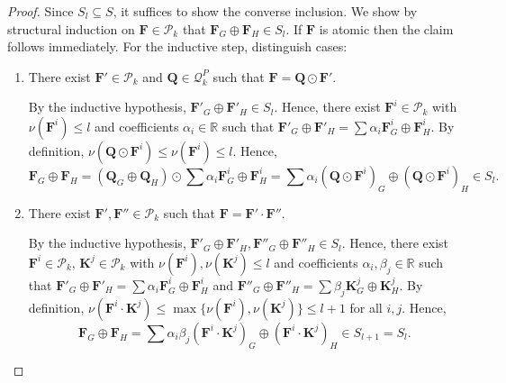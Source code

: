 \documentclass[10pt,a4paper]{amsart}
\begin{document}
\begin{proof}
	Since $S_l \subseteq S$, it suffices to show the converse inclusion.
	We show by structural induction on $\boldsymbol{F} \in \mathcal{P}_k$ that $\boldsymbol{F}_G \oplus \boldsymbol{F}_H \in S_l$.
	If $\boldsymbol{F}$ is atomic then the claim follows immediately.
	For the inductive step, distinguish cases:
	\begin{enumerate}
		\item There exist $\boldsymbol{F}' \in \mathcal{P}_k$ and $\boldsymbol{Q} \in \mathcal{Q}_k^P$ such that $\boldsymbol{F} = \boldsymbol{Q} \odot \boldsymbol{F}'$.
		
		By the inductive hypothesis, $\boldsymbol{F}'_G \oplus \boldsymbol{F}'_H \in S_l$.
		Hence, there exist $\boldsymbol{F}^i \in \mathcal{P}_k$ with $\nu(\boldsymbol{F}^i) \leq l$ and coefficients $\alpha_i \in \mathbb{R}$ such that $\boldsymbol{F}'_G \oplus \boldsymbol{F}'_H  = \sum \alpha_i \boldsymbol{F}^i_G \oplus \boldsymbol{F}^i_H$.
		By definition, $\nu(\boldsymbol{Q} \odot \boldsymbol{F}^i) \leq \nu(\boldsymbol{F}^i) \leq l$.
		Hence,
		\[
			\boldsymbol{F}_G \oplus \boldsymbol{F}_H = (\boldsymbol{Q}_G \oplus \boldsymbol{Q}_H) \odot \sum \alpha_i \boldsymbol{F}^i_G \oplus \boldsymbol{F}^i_H
			= \sum \alpha_i (\boldsymbol{Q} \odot \boldsymbol{F}^i)_G
			 \oplus (\boldsymbol{Q} \odot \boldsymbol{F}^i)_H
			 \in S_l.
		\]
		
		\item There exist $\boldsymbol{F}', \boldsymbol{F}'' \in \mathcal{P}_k$ such that $\boldsymbol{F} = \boldsymbol{F}' \cdot \boldsymbol{F}''$.
		
		By the inductive hypothesis, $\boldsymbol{F}'_G \oplus \boldsymbol{F}'_H,\boldsymbol{F}''_G \oplus \boldsymbol{F}''_H  \in S_l$.
		Hence, there exist $\boldsymbol{F}^i \in \mathcal{P}_k$, $\boldsymbol{K}^j \in \mathcal{P}_k$ with $\nu(\boldsymbol{F}^i),\nu(\boldsymbol{K}^j) \leq l$ and coefficients $\alpha_i, \beta_j \in \mathbb{R}$ such that $\boldsymbol{F}'_G \oplus \boldsymbol{F}'_H  = \sum \alpha_i \boldsymbol{F}^i_G \oplus \boldsymbol{F}^i_H$
		and $\boldsymbol{F}''_G \oplus \boldsymbol{F}''_H  = \sum \beta_j \boldsymbol{K}^j_G \oplus \boldsymbol{K}^j_H$.
		By definition, $\nu(\boldsymbol{F}^i \cdot \boldsymbol{K}^j) \leq \max\{ \nu(\boldsymbol{F}^i), \nu(\boldsymbol{K}^j)\} \leq l+1$ for all $i, j$.
		Hence, 
		\[
			\boldsymbol{F}_G \oplus \boldsymbol{F}_H = \sum \alpha_i \beta_j (\boldsymbol{F}^i \cdot \boldsymbol{K}^j)_G \oplus 
			(\boldsymbol{F}^i \cdot \boldsymbol{K}^j)_H
			\in S_{l+1}  = S_l.
		\]
		

\end{enumerate}
\end{proof}
\end{document}
